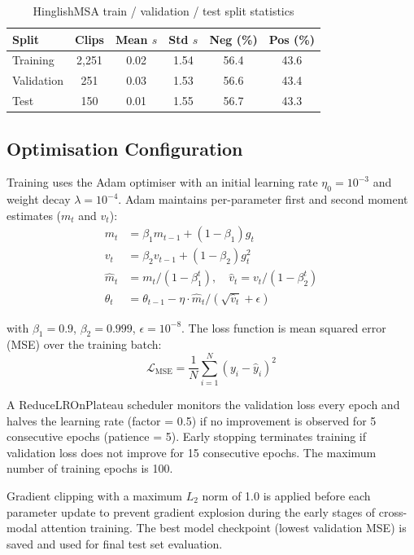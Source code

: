 \begin{table}[ht]
\centering
\caption{HinglishMSA train / validation / test split statistics}
\label{tab:splits}
\renewcommand{\arraystretch}{1.3}
\begin{tabular}{lccccc}
\toprule
\textbf{Split} & \textbf{Clips} & \textbf{Mean $s$} & \textbf{Std $s$} & \textbf{Neg (\%)} & \textbf{Pos (\%)} \\
\midrule
Training   & 2,251 & 0.02 & 1.54 & 56.4 & 43.6 \\
Validation &   251 & 0.03 & 1.53 & 56.6 & 43.4 \\
Test       &   150 & 0.01 & 1.55 & 56.7 & 43.3 \\
\bottomrule
\end{tabular}
\end{table}

\subsection{Optimisation Configuration}

Training uses the Adam optimiser \cite{vaswani2017attention} with an initial learning rate $\eta_0 = 10^{-3}$ and weight decay $\lambda = 10^{-4}$. Adam maintains per-parameter first and second moment estimates ($m_t$ and $v_t$):
\begin{align}
m_t &= \beta_1 m_{t-1} + (1 - \beta_1) g_t \\
v_t &= \beta_2 v_{t-1} + (1 - \beta_2) g_t^2 \\
\hat{m}_t &= m_t / (1 - \beta_1^t), \quad \hat{v}_t = v_t / (1 - \beta_2^t) \\
\theta_t &= \theta_{t-1} - \eta \cdot \hat{m}_t / (\sqrt{\hat{v}_t} + \epsilon)
\end{align}

with $\beta_1 = 0.9$, $\beta_2 = 0.999$, $\epsilon = 10^{-8}$. The loss function is mean squared error (MSE) over the training batch:
\[
\mathcal{L}_{\text{MSE}} = \frac{1}{N}\sum_{i=1}^{N}(y_i - \hat{y}_i)^2
\]

A ReduceLROnPlateau scheduler monitors the validation loss every epoch and halves the learning rate (factor = 0.5) if no improvement is observed for 5 consecutive epochs (patience = 5). Early stopping terminates training if validation loss does not improve for 15 consecutive epochs. The maximum number of training epochs is 100.

Gradient clipping with a maximum $L_2$ norm of 1.0 is applied before each parameter update to prevent gradient explosion during the early stages of cross-modal attention training. The best model checkpoint (lowest validation MSE) is saved and used for final test set evaluation.

